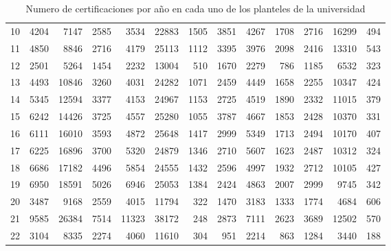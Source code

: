 \documentclass[12pt]{article}
\begin{document}
\begin{table}[ht]
{\begin{tabular}{||c||rrrrrr||rrrrrr||}
  10 & 4204 & 7147 & 2585 & 3534& 22883 &  1505& 3851 & 4267 & 1708 & 2716 &16299  &  494\\
  11 & 4850 & 8846 & 2716 & 4179& 25113 &  1112& 3395 & 3976 & 2098 & 2416 &13310  &  543\\
  12 & 2501 & 5264 & 1454 & 2232& 13004  &  510& 1670 & 2279 &  786 & 1185 & 6532  &  323\\
  13 & 4493 &10846 & 3260 & 4031& 24282  & 1071& 2459 & 4449 & 1658 & 2255 &10347  &  424\\
  14 & 5345 &12594 & 3377 & 4153& 24967  & 1153& 2725 & 4519 & 1890 & 2332 &11015  &  379\\
  15 & 6242 &14426 & 3725 & 4557& 25280  & 1055& 3787 & 4667 & 1853 & 2428 &10370  &  331\\
  16 & 6111 &16010 & 3593 & 4872& 25648  & 1417& 2999 & 5349 & 1713 & 2494 &10170  &  407\\
  17 & 6225 &16896 & 3700 & 5320& 24879  & 1346& 2710 & 5607 & 1623 & 2487 &10312  &  324\\
  18 & 6686 &17182 & 4496 & 5854& 24555  & 1432& 2596 & 4997 & 1932 & 2712 &10105  &  427\\
  19 & 6950 &18591 & 5026 & 6946& 25053  & 1384& 2424 & 4863 & 2007 & 2999 & 9745  &  342\\
  20 & 3487 & 9168 & 2559 & 4015& 11794  &  322& 1470 & 3183 & 1333 & 1774 & 4684  &  606\\
  21 & 9585 &26384 & 7514 &11323& 38172  &  248& 2873 & 7111 & 2623 & 3689 &12502  &  570\\
  22 & 3104 & 8335 & 2274 & 4060& 11610  &  304&  951 & 2214 &  863 & 1284 & 3440  &  188\\\hline\hline
\end{tabular}}
\caption{Numero de certificaciones por a\~no en cada uno de los planteles de la universidad}
\label{Tabla_Certificaciones_Plantel_Anho}
\end{table}



\newpage
\end{document}
